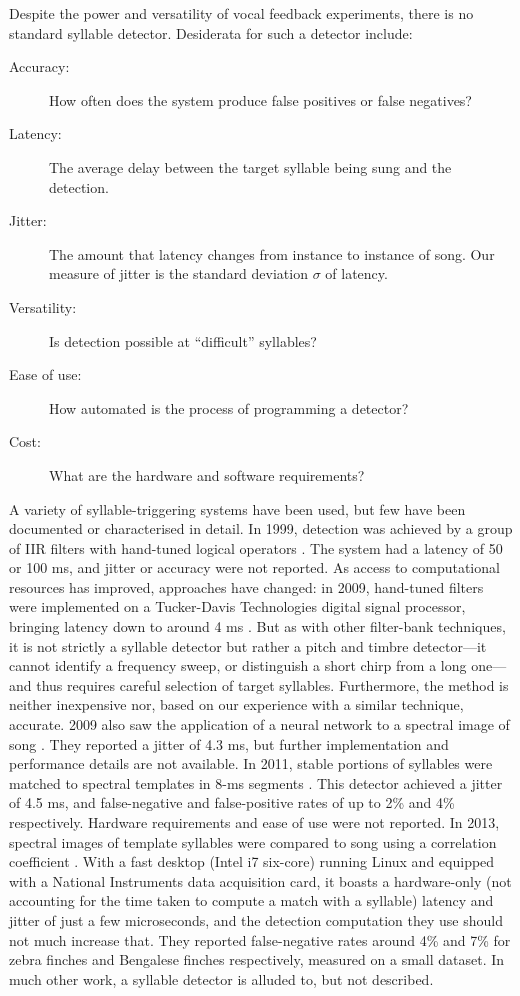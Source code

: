 \documentclass[10pt,letterpaper]{article}
\begin{document}
Despite the power and versatility of vocal feedback experiments, there
is no standard syllable detector.  Desiderata for such a detector include:
\begin{description}
\item[Accuracy:] How often does the system produce false positives or false negatives?
\item[Latency:] The average delay between the target syllable being sung and the detection.
\item[Jitter:] The amount that latency changes from instance to instance of song.  Our measure of jitter is the standard deviation $\sigma$ of latency.
\item[Versatility:] Is detection possible at ``difficult'' syllables?
\item[Ease of use:] How automated is the process of programming a detector?
\item[Cost:] What are the hardware and software requirements?
\end{description}

A variety of syllable-triggering systems have been used, but few have
been documented or characterised in detail.  In 1999,
detection was achieved by a group of IIR filters with hand-tuned logical
operators \cite{Leonardo1999}.  The system had a latency of 50 or 100 ms,
and jitter or accuracy were not reported.  As access to
computational resources has improved, approaches have changed: in
2009, hand-tuned filters were implemented on a Tucker-Davis Technologies digital signal processor, bringing latency down to around 4 ms \cite{Andalman2009}. But as with other filter-bank techniques, it
is not strictly a syllable detector but rather a pitch and timbre
detector---it cannot identify a frequency sweep, or distinguish a
short chirp from a long one---and thus requires careful selection of
target syllables.  Furthermore, the method is neither inexpensive nor,
based on our experience with a similar technique, accurate.
2009 also saw the application of a neural network to a spectral image of
song \cite{Keller2009}.  They reported a jitter of 4.3 ms, but further implementation and
performance details are not available.  In 2011, stable portions of syllables were matched to spectral templates in 8-ms
segments \cite{Warren2011}.  This detector achieved a jitter of 4.5 ms, and false-negative and
false-positive rates of up to 2\% and 4\% respectively.  Hardware
requirements and ease of use were not reported.  In 2013, spectral
images of template syllables were compared to song using a correlation coefficient \cite{Skocik2013}.  With a
fast desktop (Intel i7 six-core) running Linux and equipped with a
National Instruments data acquisition card, it boasts a hardware-only
(not accounting for the time taken to compute a match with a syllable)
latency and jitter of just a few microseconds, and the detection
computation they use should not much increase that.  They reported
false-negative rates around 4\% and 7\% for zebra finches and
Bengalese finches respectively, measured on a small dataset.  In much
other work, a syllable detector is alluded to, but not described.
\end{document}
